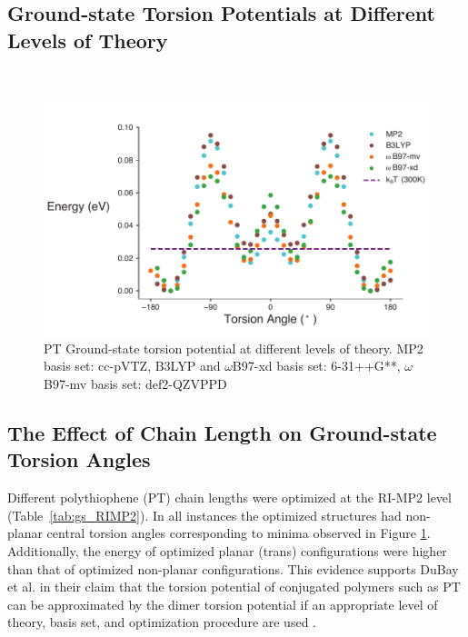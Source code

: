 \clearpage
\subsection{Ground-state Torsion Potentials at Different Levels of Theory}
\
\begin{figure}[hbt!]
    \centering
    \includegraphics{figures/append_tor_model/SI_compare_theory_torsion.pdf}
    \caption[Ground-state PT Torsion Potential at Different Levels of Theory]{PT Ground-state torsion potential at different levels of theory. MP2 basis set: cc-pVTZ, B3LYP and $\omega$B97-xd basis set: 6-31++G**, $\omega$B97-mv basis set: def2-QZVPPD}
    \label{fig:gs_theory}
\end{figure}

\subsection{The Effect of Chain Length on Ground-state Torsion Angles}
\label{subsec:chain_length_gs}

Different polythiophene (PT) chain lengths were optimized at the RI-MP2 level (Table~\ref{tab:gs_RIMP2}). In all instances the optimized structures had non-planar central torsion angles corresponding to minima observed in Figure \ref{fig:gs_theory}. Additionally, the energy of optimized planar (trans) configurations were higher than that of optimized non-planar configurations. This evidence supports DuBay et al. in their claim that the torsion potential of conjugated polymers such as PT can be approximated by the dimer torsion potential if an appropriate level of theory, basis set, and optimization procedure are used \cite{Dubay2012}.

